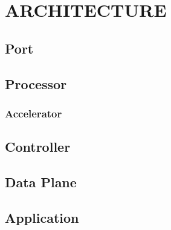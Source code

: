 \chapter{ARCHITECTURE}
\label{arch}

\section{Port}
\label{arch:port}

\section{Processor}
\label{arch:proc}

\subsection{Accelerator}
\label{arch:proc-accel}

\section{Controller}
\label{arch:controller}

\section{Data Plane}
\label{arch:dataplane}

\section{Application}
\label{arch:app}
